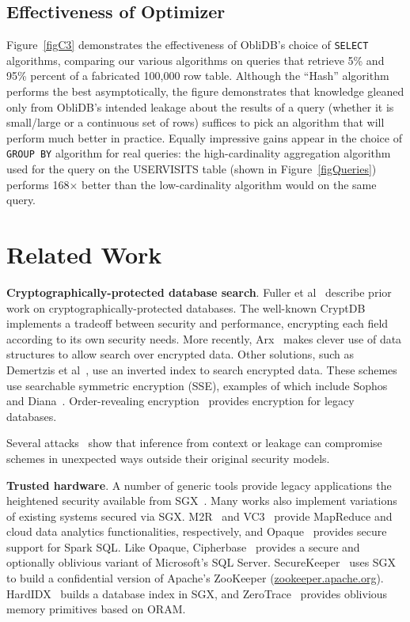 \documentclass[letterpaper,twocolumn,10pt]{article}
\def\name/{ObliDB}
\begin{document}
\subsection{Effectiveness of Optimizer}
Figure~\ref{figC3} demonstrates the effectiveness of \name/'s choice of \texttt{SELECT} algorithms, comparing our various algorithms on queries that retrieve 5\% and 95\% percent of a fabricated 100,000 row table. Although the ``Hash'' algorithm performs the best asymptotically, the figure demonstrates that knowledge gleaned only from \name/'s intended leakage about the results of a query (whether it is small/large or a continuous set of rows) suffices to pick an algorithm that will perform much better in practice. Equally impressive gains appear in the choice of \texttt{GROUP BY} algorithm for real queries: the high-cardinality aggregation algorithm used for the query on the USERVISITS table (shown in Figure~\ref{figQueries}) performs 168$\times$ better than the low-cardinality algorithm would on the same query.

\section{Related Work}\label{related}

  \noindent \textbf{Cryptographically-protected database search}.
Fuller et al~\cite{FVY+17} describe prior work on cryptographically-protected databases. The well-known CryptDB~\cite{PRZB12} implements a tradeoff between security and performance, encrypting each field according to its own security needs. More recently, Arx~\cite{PBP16} makes clever use of data structures to allow search over encrypted data. Other solutions, such as Demertzis et al~\cite{DPP+16}, use an inverted index to search encrypted data. These schemes use searchable symmetric encryption (SSE), examples of which include Sophos and Diana~\cite{Bost16, BMO17}. Order-revealing encryption~\cite{BLR+15, LW16} provides encryption for legacy databases.

Several attacks~\cite{IKK12, NKW15, CGPR15, ZKP16} show that inference from context or leakage can compromise schemes in unexpected ways outside their original security models.

  \noindent \textbf{Trusted hardware}.
A number of generic tools provide legacy applications the heightened security available from SGX~\cite{BPH15, STTS17, ATG+16, HZX+16}.
Many works also implement variations of existing systems secured via SGX. M2R~\cite{DSC+15} and VC3~\cite{SCF+15} provide MapReduce and cloud data analytics functionalities, respectively, and Opaque~\cite{ZDB+17} provides secure support for Spark SQL. Like Opaque, Cipherbase~\cite{cipherbase} provides a secure and optionally oblivious variant of Microsoft's SQL Server. SecureKeeper~\cite{BWG+16} uses SGX to build a confidential version of Apache's ZooKeeper (\url{zookeeper.apache.org}). HardIDX~\cite{FBB+17} builds a database index in SGX, and ZeroTrace~\cite{SGF17} provides oblivious memory primitives based on ORAM.
\end{document}
